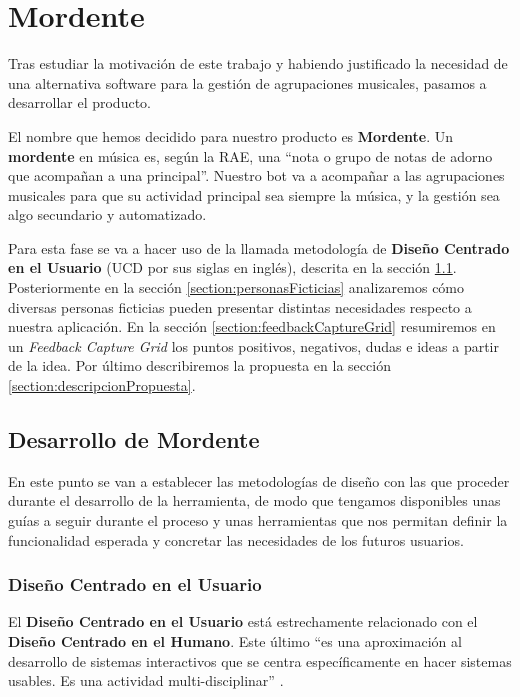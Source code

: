 \chapter{Mordente}

Tras estudiar la motivación de este trabajo y habiendo justificado la necesidad de una alternativa software para la gestión de agrupaciones musicales, pasamos a desarrollar el producto. 

El nombre que hemos decidido para nuestro producto es \textbf{Mordente}. Un \textbf{mordente} en música es, según la RAE, una ``nota o grupo de notas de adorno que acompañan a una principal''. Nuestro bot va a acompañar a las agrupaciones musicales para que su actividad principal sea siempre la música, y la gestión sea algo secundario y automatizado.

Para esta fase se va a hacer uso de la llamada metodología de \textbf{Diseño Centrado en el Usuario} (UCD por sus siglas en inglés), descrita en la sección \ref{section:desarrolloMordente}. Posteriormente en la sección \ref{section:personasFicticias} analizaremos cómo diversas personas ficticias pueden presentar distintas necesidades respecto a nuestra aplicación. En la sección \ref{section:feedbackCaptureGrid} resumiremos en un \textit{Feedback Capture Grid} los puntos positivos, negativos, dudas e ideas a partir de la idea. Por último describiremos la propuesta en la sección \ref{section:descripcionPropuesta}.

\section{Desarrollo de Mordente}\label{section:desarrolloMordente}

En este punto se van a establecer las metodologías de diseño con las que proceder durante el desarrollo de la herramienta, de modo que tengamos disponibles unas guías a seguir durante el proceso y unas herramientas que nos permitan definir la funcionalidad esperada y concretar las necesidades de los futuros usuarios.

\subsection{Diseño Centrado en el Usuario}

El \textbf{Diseño Centrado en el Usuario} está estrechamente relacionado con el \textbf{Diseño Centrado en el Humano}\cite{w3UCD}. Este último ``es una aproximación al desarrollo de sistemas interactivos que se centra específicamente en hacer sistemas usables. Es una actividad multi-disciplinar'' \cite{isoHCD}.

